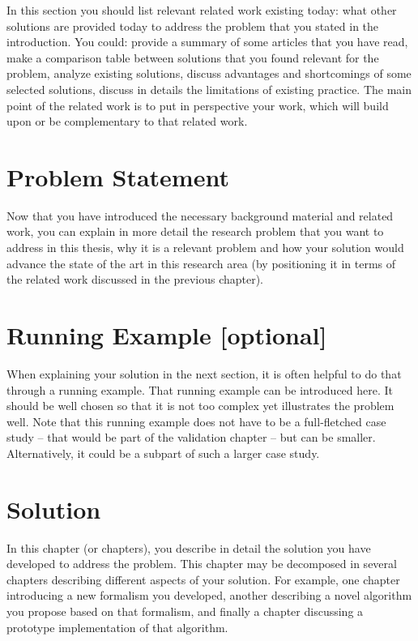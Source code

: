 \documentclass[british]{article}
\begin{document}
In this section you should list relevant related work existing today:
what other solutions are provided today to address the problem that
you stated in the introduction. You could: provide a summary of some
articles that you have read, make a comparison table between solutions
that you found relevant for the problem, analyze existing solutions,
discuss advantages and shortcomings of some selected solutions,
discuss in details the limitations of existing practice. The main
point of the related work is to put in perspective your work, which
will build upon or be complementary to that related work.

\section*{Problem Statement}

Now that you have introduced the necessary background material and
related work, you can explain in more detail the research problem that
you want to address in this thesis, why it is a relevant problem and
how your solution would advance the state of the art in this research
area (by positioning it in terms of the related work discussed in the
previous chapter).

\section*{Running Example [optional]}

When explaining your solution in the next section, it is often helpful
to do that through a running example. That running example can be
introduced here. It should be well chosen so that it is not too
complex yet illustrates the problem well. Note that this running
example does not have to be a full-fletched case study – that would be
part of the validation chapter – but can be smaller. Alternatively, it
could be a subpart of such a larger case study.

\section*{Solution}

In this chapter (or chapters), you describe in detail the solution you
have developed to address the problem. This chapter may be decomposed
in several chapters describing different aspects of your solution. For
example, one chapter introducing a new formalism you developed,
another describing a novel algorithm you propose based on that
formalism, and finally a chapter discussing a prototype implementation
of that algorithm.
\end{document}
